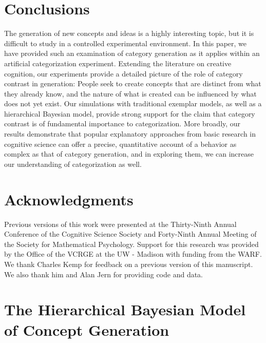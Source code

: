 \documentclass[12pt]{article}
\begin{document}
\begin{flushleft}
\section{Conclusions}

The generation of new concepts and ideas is a highly interesting topic, but it
is difficult to study in a controlled experimental environment. In this paper,
we have provided such an examination of category generation as it applies within
an artificial categorization experiment. Extending the literature on creative
cognition, our experiments provide a detailed picture of the role of category
contrast in generation: People seek to create concepts that are distinct from
what they already know, and the nature of what is created can be influenced by
what does not yet exist. Our simulations with traditional exemplar models, as
well as a hierarchical Bayesian model, provide strong support for the claim that
category contrast is of fundamental importance to categorization. More broadly,
our results demonstrate that popular explanatory approaches from basic research
in cognitive science can offer a precise, quantitative account of a behavior as
complex as that of category generation, and in exploring them, we can increase
our understanding of categorization as well.


\clearpage
\section{Acknowledgments} Previous versions of this work were presented at the
Thirty-Ninth Annual Conference of the Cognitive Science Society and Forty-Ninth
Annual Meeting of the Society for Mathematical Psychology. Support for this
research was provided by the Office of the VCRGE at the UW - Madison with
funding from the WARF. We thank Charles Kemp for feedback on a previous version
of this manuscript. We also thank him and Alan Jern for providing code and data.
\end{flushleft}


\clearpage  
\clearpage


\appendix {}

\section{The Hierarchical Bayesian Model of Concept Generation}
\label{ap:hsampling-definition}
\end{document}
